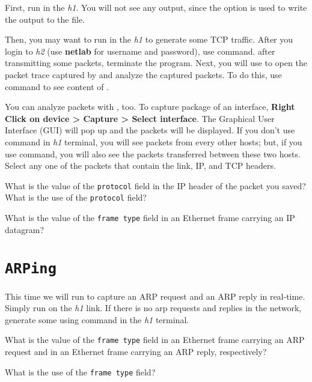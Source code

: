 \documentclass{../UTNetLab}
\begin{document}
First, run  in the \textit{h1}.
You will not see any  output, since the  option is used to write the output to the  file.

Then, you may want to run  in the \textit{h1} to generate some TCP traffic.
After you login to \textit{h2} (use \textbf{netlab} for username and password), use   command. after transmitting some packets, terminate the  program.
Next, you will use  to open the packet trace captured by  and analyze the captured packets.
To do this, use command  to see content of . 

You can analyze packets with , too. To capture package of an interface, \textbf{Right Click on device > Capture > Select interface}. 
The  Graphical User Interface (GUI) will pop up and the packets will be displayed. If you don't use   command in \textit{h1} terminal, you will see packets from every other hosts; but, if you use  command, you will also see the packets transferred between these two hosts.
Select any one of the packets that contain the link, IP, and TCP headers. 

\begin{report}
    \item What is the value of the \texttt{protocol} field in the IP header of the packet you saved?
    What is the use of the \texttt{protocol} field?

    \item What is the value of the \texttt{frame type} field in an Ethernet frame carrying an IP datagram?
\end{report}

\section{\texttt{ARPing}}
This time we will run  to capture an ARP request and an ARP reply in real-time.
Simply run  on the \textit{h1} link.
If there is no arp requests and replies in the network, generate some using  command in the \textit{h1} terminal.

\begin{report}
    \item What is the value of the \texttt{frame type} field in an Ethernet frame carrying an ARP request and in an Ethernet frame carrying an ARP reply, respectively?

    \item What is the use of the \texttt{frame type} field?
\end{report}
\end{document}
